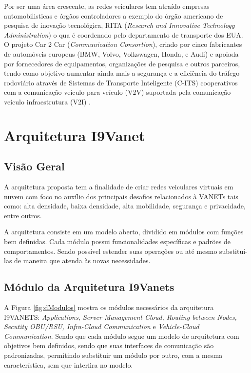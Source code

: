 \documentclass[
	12pt,				%
	oneside,			%
	a4paper,			%
	english,			%
	brazil				%
	]{abntex2ppgsi}
\begin{document}
Por ser uma área crescente, as redes veiculares tem atraído empresas automobilisticas e órgãos controladores  a exemplo do órgão americano de pesquisa de inovação tecnológica, RITA (\textit{Research and Innovative Technology Administration}) o qua é coordenado pelo departamento de transporte dos EUA. O projeto Car 2 Car (\textit{Communication Consortion}), criado por cinco fabricantes de automóveis europeus (BMW, Volvo, Volkswagen, Honda, e Audi) e apoiada por fornecedores de equipamentos, organizações de pesquisa e outros parceiros, tendo como objetivo  aumentar ainda mais a segurança e a eficiência do tráfego rodoviário através de Sistemas de Transporte Inteligente (C-ITS) cooperativos com a comunicação veículo para veículo (V2V) suportada pela comunicação veículo infraestrutura (V2I) . 

\chapter{Arquitetura I9Vanet}\label{sec:i9vanet}

\section{Visão Geral}
A arquitetura proposta tem a finalidade de criar redes veiculares virtuais em nuvem com foco no auxílio dos principais desafios relacionados à VANETs tais como: alta densidade, baixa densidade, alta mobilidade, segurança e privacidade, entre outros. 

A arquitetura consiste em um modelo aberto, dividido em módulos com funções bem definidas. Cada módulo possui funcionalidades específicas e padrões de comportamentos. Sendo possível estender suas operações ou até mesmo substituí-las de maneira que atenda às novas necessidades.

\section{Módulo da Arquitetura I9Vanets}

A Figura \ref{fig:dModulos} mostra os módulos necessários da arquitetura I9VANETS:  \textit{Applications, Server Management Cloud, Routing between Nodes, Secutity OBU/RSU, Infra-Cloud Communication} e \textit{Vehicle-Cloud Communication}. Sendo que cada módulo segue um modelo de arquitetura com objetivos bem definidos, sendo que suas interfaces de comunicação são padronizadas, permitindo substituir um módulo por outro, com a mesma característica, sem que interfira no modelo.
\end{document}
